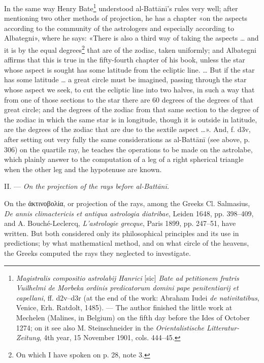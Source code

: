 \documentclass[11pt]{article}
\newcommand{\Pg}[1]{\marginpar{\footnotesize\color{gray}#1}}
\begin{document}
\par \Pg{I 309}In the same way Henry Bate\footnote{\emph{Magistralis compositio astrolabij Hanrici} [sic] \emph{Bate ad petitionem fratris Vuilhelmi de Morbeka ordinis predicatorum domini pape penitentiarij et capellani}, ff. d2v–d3r (at the end of the work: Abraham Iudei \emph{de nativitatibus}, Venice, Erh. Ratdolt, 1485). — The author finished the little work at Mechelen (Malines, in Belgium) on the fifth day before the Ides of October 1274; on it see also M. Steinschneider in the \emph{Orientalistische Litteratur-Zeitung}, 4th year, 15 November 1901, cols. 444–45.} understood al-Battānī's rules very well; after mentioning two other methods of projection, he has a chapter «on the aspects according to the community of the astrologers and especially according to Albategni», where he says: «There is also a third way of taking the aspects … and it is by the equal degrees\footnote{On which I have spoken on p. 28, note 3.} that are of the zodiac, taken uniformly; and Albategni affirms that this is true in the fifty-fourth chapter of his book, unless the star whose aspect is sought has some latitude from the ecliptic line. … But if the star has some latitude … a great circle must be imagined, passing through the star whose aspect we seek, to cut the ecliptic line into two halves, in such a way that from one of those sections to the star there are 60 degrees of the degrees of that great circle; and the degrees of the zodiac from that same section to the degree of the zodiac in which the same star is in longitude, though it is outside in latitude, are the degrees of the zodiac that are due to the sextile aspect …». And, f. d3v, after setting out very fully the same considerations as al-Battānī (see above, p. 306) on the quartile ray, he teaches the operations to be made on the astrolabe, which plainly answer to the computation of a leg of a right spherical triangle when the other leg and the hypotenuse are known.\par
\par II. — \emph{On the projection of the rays before al-Battānī.}\par
\par On the {\greekfont ἀκτινοβολία}, or projection of the rays, among the Greeks Cl. Salmasius, \emph{De annis climactericis et antiqua astrologia diatribae}, Leiden 1648, pp. 398–409, and A. Bouché-Leclercq, \emph{L'astrologie grecque}, Paris 1899, pp. 247–51, have written. But both considered only its philosophical principles and its use in predictions; by what mathematical method, and on what circle of the heavens, the Greeks computed the rays they neglected to investigate.\par
\end{document}
